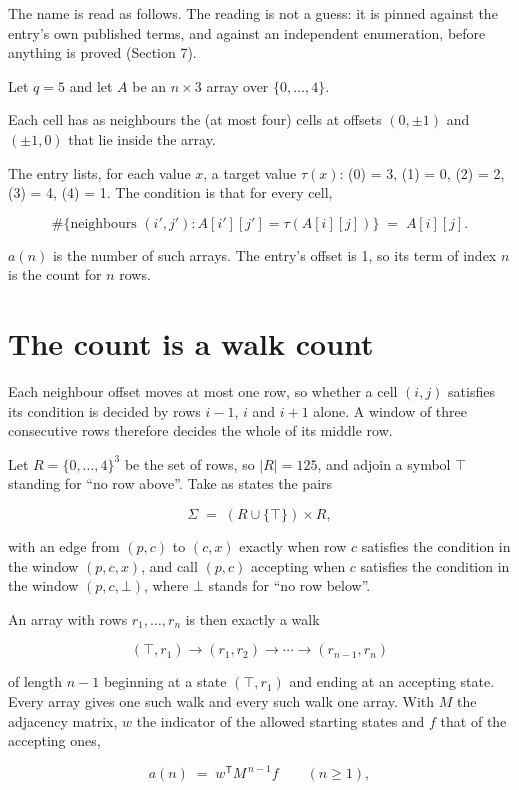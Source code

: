 \documentclass[11pt]{article}
\theoremstyle{definition}
\begin{document}
The name is read as follows. The reading is not a guess: it is pinned against the entry's own published terms, and against an independent enumeration, before anything is proved (Section 7).

Let $q = 5$ and let $A$ be an $n \times 3$ array over $\{0,\dots,4\}$.

Each cell has as neighbours the (at most four) cells at offsets $(0,\pm1)$ and $(\pm1,0)$ that lie inside the array.

The entry lists, for each value $x$, a target value $\tau(x)$: \tau(0) = 3, \tau(1) = 0, \tau(2) = 2, \tau(3) = 4, \tau(4) = 1. The condition is that for every cell,

\[\#\{\text{neighbours } (i',j') : A[i'][j'] = \tau(A[i][j])\} \;=\; A[i][j].\]

$a(n)$ is the number of such arrays. The entry's offset is 1, so its term of index $n$ is the count for $n$ rows.

\section{The count is a walk count}

Each neighbour offset moves at most one row, so whether a cell $(i,j)$ satisfies its condition is decided by rows $i-1$, $i$ and $i+1$ alone. A window of three consecutive rows therefore decides the whole of its middle row.

Let $R = \{0,\dots,4\}^{3}$ be the set of rows, so $|R| = 125$, and adjoin a symbol $\top$ standing for ``no row above''. Take as states the pairs

\[\Sigma \;=\; (R \cup \{\top\}) \times R,\]

with an edge from $(p,c)$ to $(c,x)$ exactly when row $c$ satisfies the condition in the window $(p,c,x)$, and call $(p,c)$ accepting when $c$ satisfies the condition in the window $(p,c,\bot)$, where $\bot$ stands for ``no row below''.

An array with rows $r_1,\dots,r_n$ is then exactly a walk

\[(\top,r_1) \to (r_1,r_2) \to \cdots \to (r_{n-1},r_n)\]

of length $n-1$ beginning at a state $(\top,r_1)$ and ending at an accepting state. Every array gives one such walk and every such walk one array. With $M$ the adjacency matrix, $w$ the indicator of the allowed starting states and $f$ that of the accepting ones,

\[a(n) \;=\; w^{\mathsf T} M^{\,n-1} f \qquad (n \ge 1),\]
\end{document}
